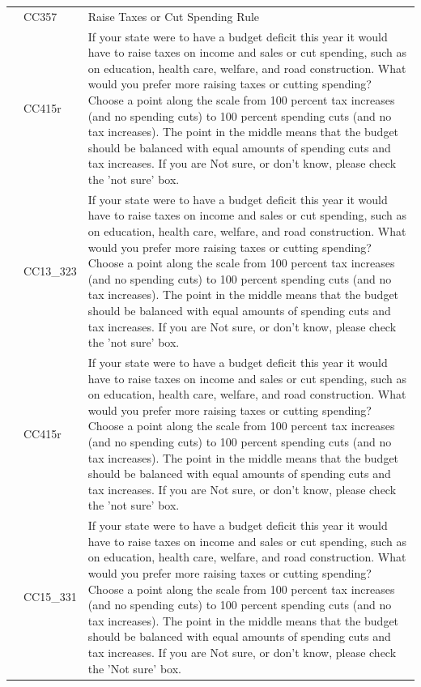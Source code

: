 \documentclass[
  12pt]{article}
\begin{document}
\begin{longtable}[t]{rl>{\raggedright\arraybackslash}p{10cm}}
\addlinespace
2011 & CC357 & Raise Taxes or Cut Spending Rule\\
\addlinespace
2012 & CC415r & If your state were to have a budget deficit this year it would have to raise taxes on income and sales or cut spending, such as on education, health care, welfare, and road construction. What would you prefer more raising taxes or cutting spending? Choose a point along the scale from 100 percent tax increases (and no spending cuts) to 100 percent spending cuts (and no tax increases). The point in the middle means that the budget should be balanced with equal amounts of spending cuts and tax increases. If you are Not sure, or don't know, please check the 'not sure' box.\\
\addlinespace
2013 & CC13\_323 & If your state were to have a budget deficit this year it would have to raise taxes on income and sales or cut spending, such as on education, health care, welfare, and road construction. What would you prefer more raising taxes or cutting spending? Choose a point along the scale from 100 percent tax increases (and no spending cuts) to 100 percent spending cuts (and no tax increases). The point in the middle means that the budget should be balanced with equal amounts of spending cuts and tax increases. If you are Not sure, or don't know, please check the 'not sure' box.\\
\addlinespace
2014 & CC415r & If your state were to have a budget deficit this year it would have to raise taxes on income and sales or cut spending, such as on education, health care, welfare, and road construction. What would you prefer more raising taxes or cutting spending? Choose a point along the scale from 100 percent tax increases (and no spending cuts) to 100 percent spending cuts (and no tax increases). The point in the middle means that the budget should be balanced with equal amounts of spending cuts and tax increases. If you are Not sure, or don't know, please check the 'not sure' box.\\
\addlinespace
2015 & CC15\_331 & If your state were to have a budget deficit this year it would have to raise taxes on income and sales or cut spending, such as on education, health care, welfare, and road construction. What would you prefer more raising taxes or cutting spending? Choose a point along the scale from 100 percent tax increases (and no spending cuts) to 100 percent spending cuts (and no tax increases). The point in the middle means that the budget should be balanced with equal amounts of spending cuts and tax increases. If you are Not sure, or don't know, please check the 'Not sure' box.\\

\end{longtable}
\end{document}
